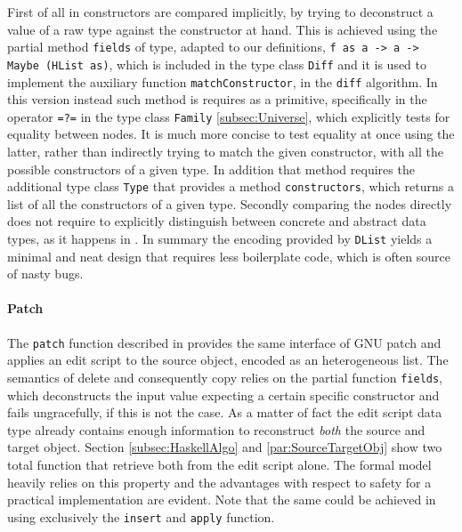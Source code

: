 \documentclass[../Thesis.tex]{subfiles}
\begin{document}
	First of all in \cite{Lemp09} constructors are compared implicitly,
	by trying to deconstruct a value of a raw type against the constructor
	at hand. This is achieved using the partial method \texttt{fields} of type,
	adapted to our definitions, \texttt{f as a -> a -> Maybe (HList as)},
	which is included in the type class \texttt{Diff} and it is used to
	implement the auxiliary function \texttt{matchConstructor}, in the
	\texttt{diff} algorithm.
	In this version instead such method is requires as a primitive,
	specifically in the operator \texttt{=?=} in the type class \texttt{Family} 
	\ref{subsec:Universe}, which explicitly tests for equality 
	between nodes.
	It is much more concise to test equality at once using the latter,
	rather than indirectly trying to match the given constructor,
	with all the possible constructors of a given type.
	In addition that method requires the additional type class \texttt{Type} that 
	provides a method \texttt{constructors}, which 
	returns a list of all the constructors of a given type.
	Secondly comparing the nodes directly does not require to 
	explicitly distinguish between concrete and abstract data types, as 
	it happens in \cite{Lemp09}.
	In summary the encoding provided by \texttt{DList} yields a
	minimal and neat design that requires less boilerplate code,
	which is often source of nasty bugs.
	
	\paragraph{Patch}
	The \texttt{patch} function described in \cite{Lemp09} provides the 
	same interface of GNU patch and applies an edit script 
	to the source object, encoded as an heterogeneous list.
	The semantics of delete and consequently copy relies
	on the partial function \texttt{fields}, which deconstructs the input
	value expecting a certain specific constructor and fails ungracefully,
	if this is not the case.
	As a matter of fact the edit script data type already contains enough 
	information to reconstruct \emph{both} the source and target object.
	Section \ref{subsec:HaskellAlgo} and \ref{par:SourceTargetObj} show
	two total function that retrieve both from the edit script alone.
	The formal model heavily relies on this property and the advantages with respect to safety for a 
	practical implementation	are evident.
	Note that 	the same could be achieved in \cite{Lemp09} using
	exclusively the \texttt{insert} and \texttt{apply} function.
\end{document}
